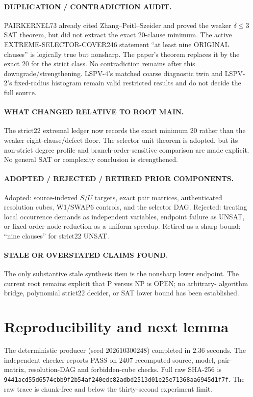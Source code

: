 \documentclass[10pt]{article}
\begin{document}
\paragraph{DUPLICATION / CONTRADICTION AUDIT.}
PAIRKERNEL73 already cited Zhang--Peitl--Szeider and proved the weaker
$\delta\le3$ SAT theorem, but did not extract the exact $20$-clause minimum.
The active EXTREME-SELECTOR-COVER246 statement ``at least nine ORIGINAL
clauses'' is logically true but nonsharp.  The paper's theorem replaces it by
the exact $20$ for the strict class.  No contradiction remains after this
downgrade/strengthening.  LSPV-4's matched coarse diagnostic twin and LSPV-2's
fixed-radius histogram remain valid restricted results and do not decide the
full source.

\paragraph{WHAT CHANGED RELATIVE TO ROOT MAIN.}
The strict22 extremal ledger now records the exact minimum $20$ rather than
the weaker eight-clause/defect floor.  The selector unit theorem is adopted,
but its non-strict degree profile and branch-order-sensitive comparison are
made explicit.  No general SAT or complexity conclusion is strengthened.

\paragraph{ADOPTED / REJECTED / RETIRED PRIOR COMPONENTS.}
Adopted: source-indexed $S/U$ targets, exact pair matrices, authenticated
resolution cubes, W1/SWAP6 controls, and the selector DAG.  Rejected: treating
local occurrence demands as independent variables, endpoint failure as UNSAT,
or fixed-order node reduction as a uniform speedup.  Retired as a sharp bound:
``nine clauses'' for strict22 UNSAT.

\paragraph{STALE OR OVERSTATED CLAIMS FOUND.}
The only substantive stale synthesis item is the nonsharp lower endpoint.
The current root remains explicit that P versus NP is OPEN; no arbitrary-
algorithm bridge, polynomial strict22 decider, or SAT lower bound has been
established.

\section{Reproducibility and next lemma}
The deterministic producer (seed $202610300248$) completed in $2.36$ seconds.
The independent checker reports PASS on $2407$ recomputed source, model,
pair-matrix, resolution-DAG and forbidden-cube checks.  Full raw SHA-256 is
\texttt{9441acd55d6574cbb9f2b54af240edc82adbd2513d01e25e71368aa6945d1f7f}.
The raw trace is chunk-free and below the thirty-second experiment limit.
\end{document}
